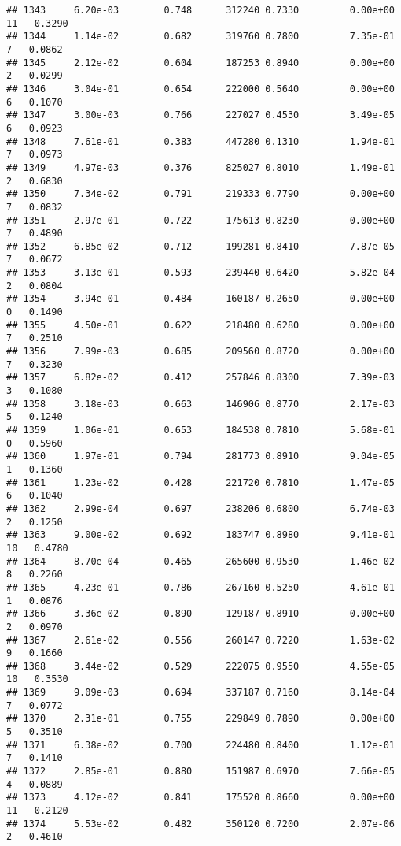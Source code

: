 \documentclass[
]{article}
\begin{document}
\begin{verbatim}
## 1343     6.20e-03        0.748      312240 0.7330         0.00e+00  11   0.3290
## 1344     1.14e-02        0.682      319760 0.7800         7.35e-01   7   0.0862
## 1345     2.12e-02        0.604      187253 0.8940         0.00e+00   2   0.0299
## 1346     3.04e-01        0.654      222000 0.5640         0.00e+00   6   0.1070
## 1347     3.00e-03        0.766      227027 0.4530         3.49e-05   6   0.0923
## 1348     7.61e-01        0.383      447280 0.1310         1.94e-01   7   0.0973
## 1349     4.97e-03        0.376      825027 0.8010         1.49e-01   2   0.6830
## 1350     7.34e-02        0.791      219333 0.7790         0.00e+00   7   0.0832
## 1351     2.97e-01        0.722      175613 0.8230         0.00e+00   7   0.4890
## 1352     6.85e-02        0.712      199281 0.8410         7.87e-05   7   0.0672
## 1353     3.13e-01        0.593      239440 0.6420         5.82e-04   2   0.0804
## 1354     3.94e-01        0.484      160187 0.2650         0.00e+00   0   0.1490
## 1355     4.50e-01        0.622      218480 0.6280         0.00e+00   7   0.2510
## 1356     7.99e-03        0.685      209560 0.8720         0.00e+00   7   0.3230
## 1357     6.82e-02        0.412      257846 0.8300         7.39e-03   3   0.1080
## 1358     3.18e-03        0.663      146906 0.8770         2.17e-03   5   0.1240
## 1359     1.06e-01        0.653      184538 0.7810         5.68e-01   0   0.5960
## 1360     1.97e-01        0.794      281773 0.8910         9.04e-05   1   0.1360
## 1361     1.23e-02        0.428      221720 0.7810         1.47e-05   6   0.1040
## 1362     2.99e-04        0.697      238206 0.6800         6.74e-03   2   0.1250
## 1363     9.00e-02        0.692      183747 0.8980         9.41e-01  10   0.4780
## 1364     8.70e-04        0.465      265600 0.9530         1.46e-02   8   0.2260
## 1365     4.23e-01        0.786      267160 0.5250         4.61e-01   1   0.0876
## 1366     3.36e-02        0.890      129187 0.8910         0.00e+00   2   0.0970
## 1367     2.61e-02        0.556      260147 0.7220         1.63e-02   9   0.1660
## 1368     3.44e-02        0.529      222075 0.9550         4.55e-05  10   0.3530
## 1369     9.09e-03        0.694      337187 0.7160         8.14e-04   7   0.0772
## 1370     2.31e-01        0.755      229849 0.7890         0.00e+00   5   0.3510
## 1371     6.38e-02        0.700      224480 0.8400         1.12e-01   7   0.1410
## 1372     2.85e-01        0.880      151987 0.6970         7.66e-05   4   0.0889
## 1373     4.12e-02        0.841      175520 0.8660         0.00e+00  11   0.2120
## 1374     5.53e-02        0.482      350120 0.7200         2.07e-06   2   0.4610

\end{verbatim}
\end{document}
